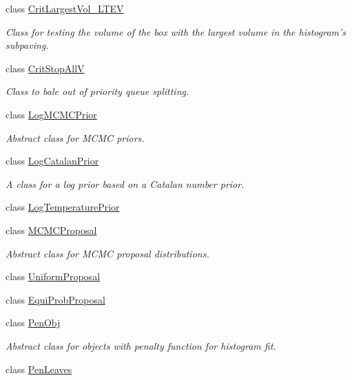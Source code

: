 \begin{DoxyCompactItemize}
class \hyperlink{classsubpavings_1_1CritLargestVol__LTEV}{\-Crit\-Largest\-Vol\-\_\-\-L\-T\-E\-V}
\begin{DoxyCompactList}\small\item\em \-Class for testing the volume of the box with the largest volume in the histogram's subpaving. \end{DoxyCompactList}\item 
class \hyperlink{classsubpavings_1_1CritStopAllV}{\-Crit\-Stop\-All\-V}
\begin{DoxyCompactList}\small\item\em \-Class to bale out of priority queue splitting. \end{DoxyCompactList}\item 
class \hyperlink{classsubpavings_1_1LogMCMCPrior}{\-Log\-M\-C\-M\-C\-Prior}
\begin{DoxyCompactList}\small\item\em \-Abstract class for \-M\-C\-M\-C priors. \end{DoxyCompactList}\item 
class \hyperlink{classsubpavings_1_1LogCatalanPrior}{\-Log\-Catalan\-Prior}
\begin{DoxyCompactList}\small\item\em \-A class for a log prior based on a \-Catalan number prior. \end{DoxyCompactList}\item 
class \hyperlink{classsubpavings_1_1LogTemperaturePrior}{\-Log\-Temperature\-Prior}
\item 
class \hyperlink{classsubpavings_1_1MCMCProposal}{\-M\-C\-M\-C\-Proposal}
\begin{DoxyCompactList}\small\item\em \-Abstract class for \-M\-C\-M\-C proposal distributions. \end{DoxyCompactList}\item 
class \hyperlink{classsubpavings_1_1UniformProposal}{\-Uniform\-Proposal}
\item 
class \hyperlink{classsubpavings_1_1EquiProbProposal}{\-Equi\-Prob\-Proposal}
\item 
class \hyperlink{classsubpavings_1_1PenObj}{\-Pen\-Obj}
\begin{DoxyCompactList}\small\item\em \-Abstract class for objects with penalty function for histogram fit. \end{DoxyCompactList}\item 
class \hyperlink{classsubpavings_1_1PenLeaves}{\-Pen\-Leaves}

\end{DoxyCompactItemize}
